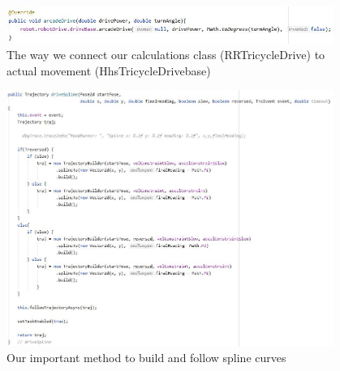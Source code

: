 \begin{figure}[htp]
\centering
\includegraphics[width=0.95\textwidth, angle=0]{Meetings/January/01-13-22/1-13-22 pic5 - James Hu.JPG}
\caption{The way we connect our calculations class (RRTricycleDrive) to actual movement (HhsTricycleDrivebase)}
\label{fig:011322_5}
\end{figure}

\begin{figure}[htp]
\centering
\includegraphics[width=0.95\textwidth, angle=0]{Meetings/January/01-13-22/1-13-22 pic6 - James Hu.JPG}
\caption{Our important method to build and follow spline curves}
\label{fig:011322_6}
\end{figure}






